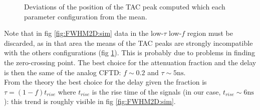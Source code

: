 \documentclass[11pt,a4 paper]{article}
\begin{document}
\begin{figure}[H]
    \centering
    \caption{Deviations of the position of the TAC peak computed which each parameter configuration from the mean.}
    \label{fig:Mean2D:sim}
\end{figure}


Note that in fig \ref{fig:FWHM2D:sim} data in the low-$\tau$ low-$f$ region must be discarded, as in that area the means of the TAC peaks are strongly incompatible with the others configurations (fig \ref{fig:Mean2D:sim}). This is probably due to problems in finding the zero-crossing point. The best choice for the attenuation fraction and the delay is then the same of the analog CFTD: $f \sim 0.2$ and $\tau \sim 5\si{\nano\second}$.\\
From the theory the best choice for the delay given the fraction is $\tau = (1 - f)t_{rise}$ where $t_{rise}$ is the rise time of the signals (in our case, $t_{rise}\sim 6\si{\nano\second}$): this trend is roughly visible in fig \ref{fig:FWHM2D:sim}.

%
\end{document}
